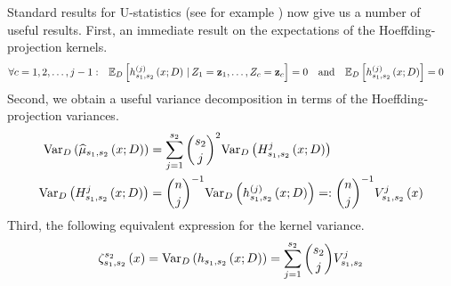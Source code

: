 Standard results for U-statistics (see for example \citet{lee_u-statistics_2019}) now give us a number of useful results.
First, an immediate result on the expectations of the Hoeffding-projection kernels.
\begin{align}\label{eq:H_k_expectation}
	\forall c = 1,2,\dotsc, j-1: \quad & \mathbb{E}_{D}\left[h_{s_1, s_2}^{(j)}\left(x; D\right) \, | \, Z_1 = \mathbf{z}_1, \dotsc, Z_c = \mathbf{z}_c\right] = 0
	\quad \text{and} \quad
	\mathbb{E}_{D}\left[h_{s_1, s_2}^{(j)}\left(x; D\right)\right] = 0
\end{align}
Second, we obtain a useful variance decomposition in terms of the Hoeffding-projection variances.
\begin{align}\label{eq:Var_decomp}
	\text{Var}_{D}\left(\widehat{\mu}_{s_1, s_2}\left(x; D\right)\right)
	 & = \sum_{j = 1}^{s_2} \binom{s_2}{j}^2 \text{Var}_{D}\left(H_{s_1, s_2}^{j}\left(x; D\right)\right) \\
	\text{Var}_{D}\left(H_{s_1, s_2}^{j}\left(x; D\right)\right)
	 & = \binom{n}{j}^{-1} \text{Var}_{D}\left(h_{s_1, s_2}^{(j)}\left(x; D\right)\right)
	=: \binom{n}{j}^{-1} V_{s_1, s_2}^{j}\left(x\right)
\end{align}
Third, the following equivalent expression for the kernel variance.
\begin{equation}\label{eq:k_var}
	\zeta_{s_1, s_2}^{s_2}\left(x\right)
	= \text{Var}_{D}\left(h_{s_1, s_2}\left(x; D\right)\right)
	= \sum_{j = 1}^{s_2} \binom{s_2}{j}V_{s_1, s_2}^{j}
\end{equation}